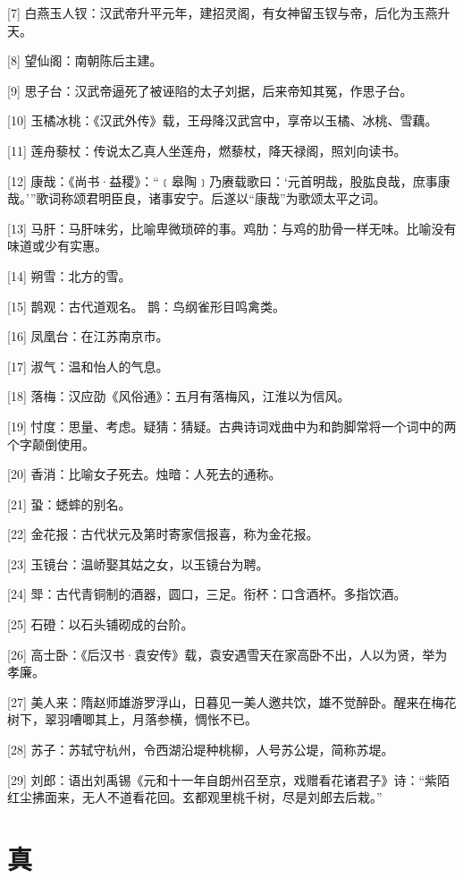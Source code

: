 \documentclass[12pt,UTF8]{ctexbook}
\begin{document}
[7] 白燕玉人钗：汉武帝升平元年，建招灵阁，有女神留玉钗与帝，后化为玉燕升天。

[8] 望仙阁：南朝陈后主建。

[9] 思子台：汉武帝逼死了被诬陷的太子刘据，后来帝知其冤，作思子台。

[10] 玉橘冰桃：《汉武外传》载，王母降汉武宫中，享帝以玉橘、冰桃、雪藕。

[11] 莲舟藜杖：传说太乙真人坐莲舟，燃藜杖，降天禄阁，照刘向读书。

[12] 康哉：《尚书·益稷》：“﹝皋陶﹞乃赓载歌曰：‘元首明哉，股肱良哉，庶事康哉。’”歌词称颂君明臣良，诸事安宁。后遂以“康哉”为歌颂太平之词。

[13] 马肝：马肝味劣，比喻卑微琐碎的事。鸡肋：与鸡的肋骨一样无味。比喻没有味道或少有实惠。

[14] 朔雪：北方的雪。

[15] 鹊观：古代道观名。 鹊：鸟纲雀形目鸣禽类。

[16] 凤凰台：在江苏南京市。

[17] 淑气：温和怡人的气息。

[18] 落梅：汉应劭《风俗通》：五月有落梅风，江淮以为信风。

[19] 忖度：思量、考虑。疑猜：猜疑。古典诗词戏曲中为和韵脚常将一个词中的两个字颠倒使用。

[20] 香消：比喻女子死去。烛暗：人死去的通称。

[21] 蛩：蟋蟀的别名。

[22] 金花报：古代状元及第时寄家信报喜，称为金花报。

[23] 玉镜台：温峤娶其姑之女，以玉镜台为聘。

[24] 斝：古代青铜制的酒器，圆口，三足。衔杯：口含酒杯。多指饮酒。

[25] 石磴：以石头铺砌成的台阶。

[26] 高士卧：《后汉书·袁安传》载，袁安遇雪天在家高卧不出，人以为贤，举为孝廉。

[27] 美人来：隋赵师雄游罗浮山，日暮见一美人邀共饮，雄不觉醉卧。醒来在梅花树下，翠羽嘈唧其上，月落参横，惆怅不已。

[28] 苏子：苏轼守杭州，令西湖沿堤种桃柳，人号苏公堤，简称苏堤。

[29] 刘郎：语出刘禹锡《元和十一年自朗州召至京，戏赠看花诸君子》诗：“紫陌红尘拂面来，无人不道看花回。玄都观里桃千树，尽是刘郎去后栽。”





\chapter{真}
\end{document}
